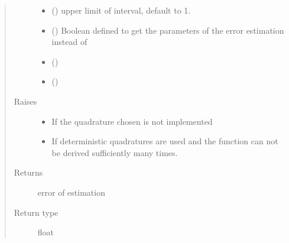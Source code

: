 \documentclass[letterpaper,10pt,english]{sphinxmanual}
\begin{document}
\begin{fulllineitems}
\begin{quote}
\begin{description}
\begin{itemize}
\item {} 
 (\sphinxstyleliteralemphasis{\sphinxupquote{, }}) \textendash{} upper limit of interval, default to 1.

\item {} 
 (\sphinxstyleliteralemphasis{\sphinxupquote{, }}) \textendash{} Boolean defined to get the parameters of the error estimation instead of

\item {} 
 () \textendash{} 

\item {} 
 () \textendash{} 

\end{itemize}

\item[{Raises}] \leavevmode\begin{itemize}
\item {} 
 \textendash{} If the quadrature chosen is not implemented

\item {} 
 \textendash{} If deterministic quadratures are used and the function can not be derived sufficiently many times.

\end{itemize}

\item[{Returns}] \leavevmode
error of estimation

\item[{Return type}] \leavevmode
float

\end{description}\end{quote}

\end{fulllineitems}

\end{document}
